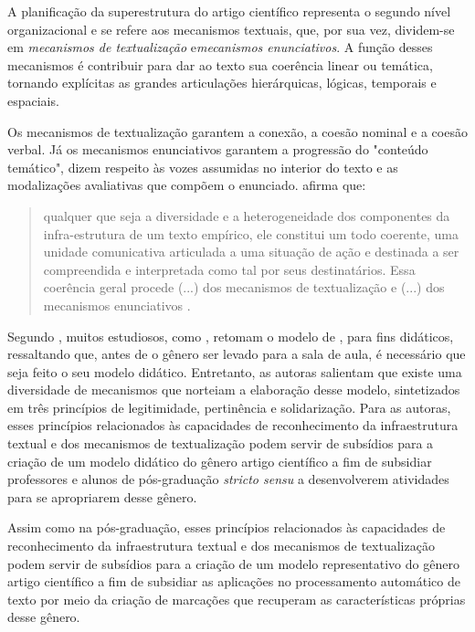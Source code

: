 \documentclass[portuguese]{textolivre}
\begin{document}
A planificação da superestrutura do artigo científico representa o segundo nível organizacional e se refere aos mecanismos textuais, que, por sua vez, dividem-se em \textit{mecanismos de textualização} e\textit{mecanismos enunciativos}. A função desses mecanismos é contribuir para dar ao texto sua coerência linear ou temática, tornando explícitas as grandes articulações hierárquicas, lógicas, temporais e espaciais.

Os mecanismos de textualização garantem a conexão, a coesão nominal e a coesão verbal. Já os mecanismos enunciativos garantem a progressão do "conteúdo temático", dizem respeito às vozes assumidas no interior do texto e as modalizações avaliativas que compõem o enunciado. \textcite{bronckart_atividade_1999} afirma que:

\begin{quote}
    qualquer que seja a diversidade e a heterogeneidade dos componentes da infra-estrutura de um texto empírico, ele constitui um todo coerente, uma unidade comunicativa articulada a uma situação de ação e destinada a ser compreendida e interpretada como tal por seus destinatários. Essa coerência geral procede (...) dos mecanismos de textualização e (...) dos mecanismos enunciativos \cite[p. 259]{bronckart_atividade_1999}.
\end{quote}

Segundo \textcite{silva_elaboracao_2014}, muitos estudiosos, como \textcite{schneuwly_generos_2004}, retomam o modelo de \textcite{bronckart_atividade_1999}, para fins didáticos, ressaltando que, antes de o gênero ser levado para a sala de aula, é necessário que seja feito o seu modelo didático. Entretanto, as autoras salientam que existe uma diversidade de mecanismos que norteiam a elaboração desse modelo, sintetizados em três princípios de legitimidade, pertinência e solidarização. Para as autoras, esses princípios relacionados às capacidades de reconhecimento da infraestrutura textual e dos mecanismos de textualização podem servir de subsídios para a criação de um modelo didático do gênero artigo científico a fim de subsidiar professores e alunos de pós-graduação \textit{stricto sensu} a desenvolverem atividades para se apropriarem desse gênero.

Assim como na pós-graduação, esses princípios relacionados às capacidades de reconhecimento da infraestrutura textual e dos mecanismos de textualização podem servir de subsídios para a criação de um modelo representativo do gênero artigo científico a fim de subsidiar as aplicações no processamento automático de texto por meio da criação de marcações que recuperam as características próprias desse gênero.
\end{document}
